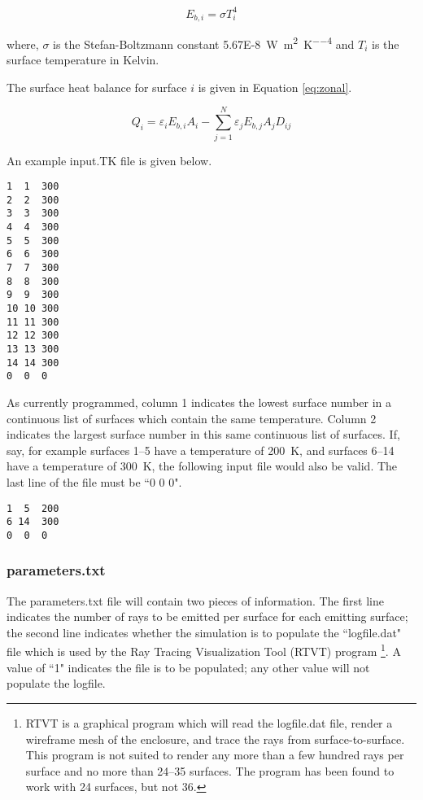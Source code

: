\documentclass{article}
\begin{document}
\begin{equation}
    E_{b,i} = \sigma T_i^4
    \label{eq:bbpower}
\end{equation}

where, $\sigma$ is the Stefan-Boltzmann constant \SI{5.67E-8}{\watt\per\meter\squared\per\kelvin\tothe{4}} and $T_i$ is the surface temperature in Kelvin.

The surface heat balance for surface $i$ is given in Equation \ref{eq:zonal}.

\begin{equation}
    Q_i = \varepsilon_i E_{b,i} A_i - \sum_{j=1}^N \varepsilon_j E_{b,j} A_j D_{ij}
    \label{eq:zonal}
\end{equation}

An example input.TK file is given below.

\begin{lstlisting}
1  1  300
2  2  300
3  3  300
4  4  300
5  5  300
6  6  300
7  7  300
8  8  300
9  9  300
10 10 300
11 11 300
12 12 300
13 13 300
14 14 300
0  0  0
\end{lstlisting}

As currently programmed, column 1 indicates the lowest surface number in a continuous list of surfaces which contain the same temperature. Column 2 indicates the largest surface number in this same continuous list of surfaces. If, say, for example surfaces 1--5 have a temperature of \SI{200}{\kelvin}, and surfaces 6--14 have a temperature of \SI{300}{\kelvin}, the following input file would also be valid. The last line of the file must be ``0 0 0".

\begin{lstlisting}
1  5  200
6 14  300
0  0  0
\end{lstlisting}

\subsubsection{parameters.txt}

The parameters.txt file will contain two pieces of information. The first line indicates the number of rays to be emitted per surface for each emitting surface; the second line indicates whether the simulation is to populate the ``logfile.dat" file which is used by the Ray Tracing Visualization Tool (RTVT) program \citep{RTVT} \footnote{RTVT is a graphical program which will read the logfile.dat file, render a wireframe mesh of the enclosure, and trace the rays from surface-to-surface. This program is not suited to render any more than a few hundred rays per surface and no more than 24--35 surfaces. The program has been found to work with 24 surfaces, but not 36.}. A value of ``1" indicates the file is to be populated; any other value will not populate the logfile.
\end{document}
